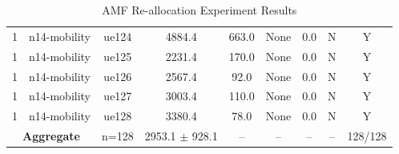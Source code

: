 \begin{table}[ht]
\begin{tabular}{|c|c|c|c|c|c|c|c|c|}
1 & n14-mobility & ue124 & 4884.4 & 663.0 & None & 0.0 & N & Y \\
1 & n14-mobility & ue125 & 2231.4 & 170.0 & None & 0.0 & N & Y \\
1 & n14-mobility & ue126 & 2567.4 & 92.0 & None & 0.0 & N & Y \\
1 & n14-mobility & ue127 & 3003.4 & 110.0 & None & 0.0 & N & Y \\
1 & n14-mobility & ue128 & 3380.4 & 78.0 & None & 0.0 & N & Y \\
\multicolumn{2}{|c|}{\textbf{Aggregate}} & n=128 & 2953.1 $\pm$ 928.1 & -- & -- & -- & -- & 128/128 \\
\hline
\end{tabular}
\caption{AMF Re-allocation Experiment Results}
\label{tab:amf_realloc}
\end{table}
